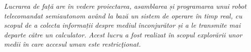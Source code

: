 \thispagestyle{empty}
\begin{flushleft}

\vspace*{100px}

\justify\large\textit{
    Lucrarea de față are în vedere proiectarea, asamblarea și programarea unui robot telecomandat semiautonom având la bază un sistem de operare în timp real, cu scopul de a colecta informații despre mediul înconjurător și a le transmite mai departe către un calculator. Acest lucru a fost realizat în scopul explorării unor medii în care accesul uman este restricţionat.
}

\end{flushleft}
